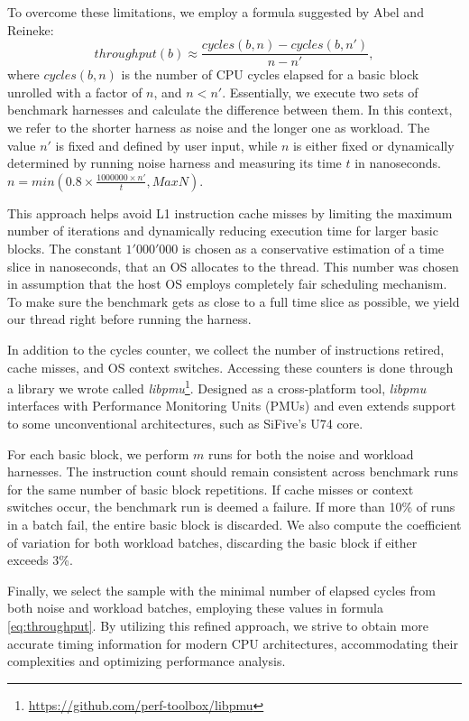 To overcome these limitations, we employ a formula suggested by Abel and Reineke\cite{abelUiCAAccurateThroughput2022}:
\begin{equation}
throughput(b) \approx \frac{cycles(b, n) - cycles(b, n')}{n - n'},
  \label{eq:throughput}
\end{equation}
where $cycles(b, n)$ is the number of CPU cycles elapsed for a basic block unrolled with a factor of $n$,
and $n < n'$. Essentially, we execute two sets of benchmark harnesses and calculate the difference between
them. In this context, we refer to the shorter harness as noise and the longer one as workload. The value $n'$
is fixed and defined by user input, while $n$ is either fixed or dynamically determined by running noise
harness and measuring its time $t$ in nanoseconds. $n = min(0.8 \times \frac{1000000 \times n'}{t}, MaxN)$.

This approach helps avoid L1 instruction cache misses by limiting the maximum number of iterations and 
dynamically reducing execution time for larger basic blocks. The constant $1'000'000$ is chosen as a 
conservative estimation of a time slice in nanoseconds, that an OS allocates to the thread. This number 
was chosen in assumption that the host OS employs completely fair scheduling mechanism. To make sure the 
benchmark gets as close to a full time slice as possible, we yield our thread right before running the 
harness.

In addition to the cycles counter, we collect the number of instructions retired, cache misses, and OS 
context switches. Accessing these counters is done through a library we wrote called 
\textit{libpmu}\footnote{\url{https://github.com/perf-toolbox/libpmu}}. 
Designed as a cross-platform tool, \textit{libpmu} interfaces with Performance Monitoring Units (PMUs) 
and even extends support to some unconventional architectures, such as SiFive's U74 core.

For each basic block, we perform $m$ runs for both the noise and workload harnesses. The instruction 
count should remain consistent across benchmark runs for the same number of basic block repetitions. 
If cache misses or context switches occur, the benchmark run is deemed a failure. If more than 10\% of 
runs in a batch fail, the entire basic block is discarded. We also compute the coefficient of variation 
for both workload batches, discarding the basic block if either exceeds 3\%.

Finally, we select the sample with the minimal number of elapsed cycles from both noise and workload 
batches, employing these values in formula \ref{eq:throughput}. By utilizing this refined approach, 
we strive to obtain more accurate timing information for modern CPU architectures, accommodating their 
complexities and optimizing performance analysis.

